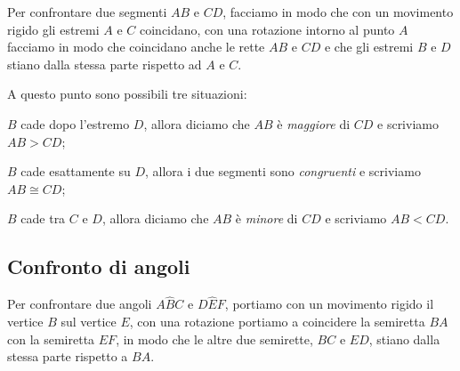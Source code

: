 Per confrontare due segmenti \(AB\) e \(CD\), facciamo in modo che con un 
movimento rigido gli estremi \(A\) e \(C\) coincidano, con una rotazione 
intorno al punto \(A\) facciamo in  modo che coincidano anche le rette 
\(AB\) e \(CD\) e che gli estremi \(B\) e \(D\) stiano dalla stessa parte 
rispetto ad \(A\) e \(C\).


\begin{inaccessibleblock}
\begin{center}\end{center}
\end{inaccessibleblock}

A questo punto sono possibili tre situazioni:
\begin{itemize*}
\item \(B\) cade dopo l'estremo \(D\), allora diciamo che \(AB\) è 
\emph{maggiore} di \(CD\) e scriviamo \(AB>CD\);
\item \(B\) cade esattamente su \(D\), allora i due segmenti sono 
\emph{congruenti} e scriviamo \(AB\cong CD\);
\item \(B\) cade tra \(C\) e \(D\), allora diciamo che \(AB\) è \emph{minore} 
di \(CD\) e scriviamo \(AB<CD\).
\end{itemize*}

\subsection{Confronto di angoli}

Per confrontare due angoli \(A\widehat{B}C\) e \(D\widehat{E}F\), 
portiamo con un movimento rigido il vertice \(B\) sul vertice \(E\), con 
una rotazione portiamo a coincidere la semiretta \(BA\) con la 
semiretta \(EF\), in modo che le altre due semirette, \(BC\) e \(ED\), 
stiano dalla stessa parte rispetto a \(BA\).


\begin{inaccessibleblock}
\begin{center}\end{center}
\end{inaccessibleblock}

